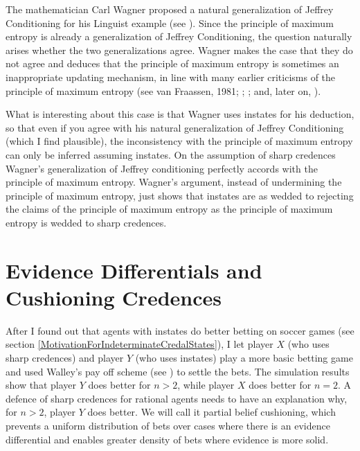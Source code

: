 The mathematician Carl Wagner proposed a natural
generalization of Jeffrey Conditioning for his Linguist
example (see ). Since the
principle of maximum entropy is already a
generalization of Jeffrey Conditioning, the question
naturally arises whether the two generalizations agree.
Wagner makes the case that they do not agree and
deduces that the principle of maximum entropy is
sometimes an inappropriate updating mechanism, in line
with many earlier criticisms of the principle of
maximum entropy (see van Fraassen, 1981;
; ;
and, later on, ).

What is interesting about this case is that Wagner uses
instates for his deduction, so that even if you agree
with his natural generalization of Jeffrey Conditioning
(which I find plausible), the inconsistency with the
principle of maximum entropy can only be inferred
assuming instates. On the assumption of sharp credences
Wagner's generalization of Jeffrey conditioning
perfectly accords with the principle of maximum
entropy. Wagner's argument, instead of undermining the
principle of maximum entropy, just shows that instates
are as wedded to rejecting the claims of the principle
of maximum entropy as the principle of maximum entropy
is wedded to sharp credences.

\section{Evidence Differentials and Cushioning
  Credences}
\label{WalleysWorldCupWoes}

After I found out that agents with instates do better
betting on soccer games (see section
\ref{MotivationForIndeterminateCredalStates}), I let
player $X$ (who uses sharp credences) and player $Y$
(who uses instates) play a more basic betting game and
used Walley's pay off scheme (see
) to settle the bets. The
simulation results show that player $Y$ does better for
$n>2$, while player $X$ does better for $n=2$. A
defence of sharp credences for rational agents needs to
have an explanation why, for $n>2$, player $Y$ does
better. We will call it partial belief cushioning,
which prevents a uniform distribution of bets over
cases where there is an evidence differential and
enables greater density of bets where evidence is more
solid.

